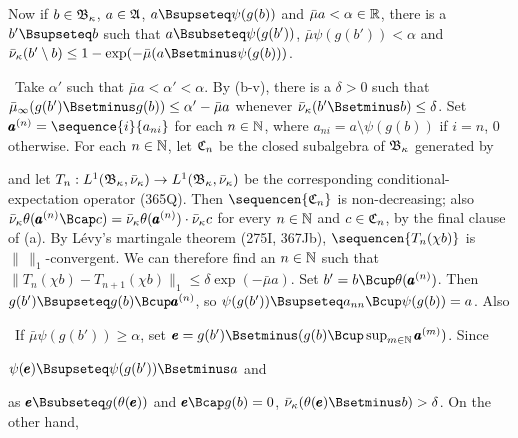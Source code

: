 {\medskip

 Now if $b\in\frak B_{\kappa}$, $a\in\frak A$,
$a\Bsupseteq\psi(g(b))$ and
$\bar\mu a<\alpha\in\Bbb R$, there is a $b'\Bsupseteq b$ such that
$a\Bsubseteq\psi(g(b'))$, $\bar\mu\psi(g(b'))<\alpha$ and
$\bar\nu_{\kappa}(b'\setminus b)\le 1-\exp(-\bar\mu(a\Bsetminus\psi(g(b)))$.

\Prf\ Take $\alpha'$ such that $\bar\mu a<\alpha'<\alpha$.
By (b-v), there is a $\delta>0$ such that
$\bar\mu_{\infty}(g(b')\Bsetminus g(b))\le\alpha'-\bar\mu a$ whenever
$\bar\nu_{\kappa}(b'\Bsetminus b)\le\delta$.
Set $\pmb{a}^{(n)}=\sequence{i}{a_{ni}}$ for each
$n\in\Bbb N$, where $a_{ni}=a\setminus\psi(g(b))$ if $i=n$, $0$
otherwise.   For each $n\in\Bbb N$, let $\frak C_n$ be the closed
subalgebra of $\frak B_{\kappa}$ generated by


\noindent and let $T_n:L^1(\frak B_{\kappa},\bar\nu_{\kappa})
\to L^1(\frak B_{\kappa},\bar\nu_{\kappa})$ be
the corresponding conditional-expectation operator (365Q).
Then $\sequencen{\frak C_n}$ is non-decreasing;  also
$\bar\nu_{\kappa}\theta(\pmb{a}^{(n)}\Bcap c)
=\bar\nu_{\kappa}\theta(\pmb{a}^{(n)})\cdot\bar\nu_{\kappa} c$ for every $n\in\Bbb N$ and
$c\in\frak C_n$, by the final clause of (a).   By L\'evy's martingale
theorem (275I, 367Jb), $\sequencen{T_n(\chi b)}$ is
$\|\,\|_1$-convergent.   We can therefore find an $n\in\Bbb N$ such that
$\|T_n(\chi b)-T_{n+1}(\chi b)\|_1\le\delta\exp(-\bar\mu a)$.
Set $b'=b\Bcup\theta(\pmb{a}^{(n)})$.   Then
$g(b')\Bsupseteq g(b)\Bcup\pmb{a}^{(n)}$, so
$\psi(g(b'))\Bsupseteq a_{nn}\Bcup\psi(g(b))=a$.  Also


\Quer\ If $\bar\mu\psi(g(b'))\ge\alpha$, set
$\pmb{e}=g(b')\Bsetminus(g(b)\Bcup\sup_{m\in\Bbb N}\pmb{a}^{(m)})$.
Since


\noindent $\psi(\pmb{e})\Bsupseteq\psi(g(b'))\Bsetminus a$  and


\noindent as
$\pmb{e}\Bsubseteq g(\theta(\pmb{e}))$ and $\pmb{e}\Bcap g(b)=0$,
$\bar\nu_{\kappa}(\theta(\pmb{e})\Bsetminus b)>\delta$.
On the other hand,

}

